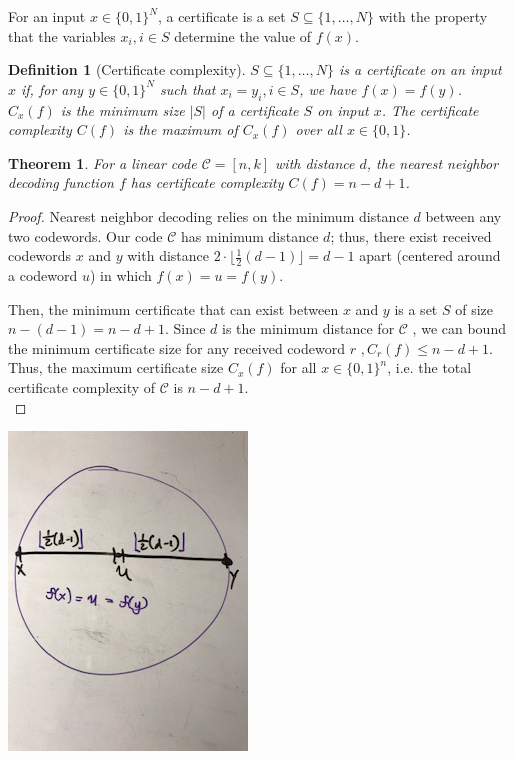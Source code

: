 \documentclass[12pt]{article}
\newtheorem{theorem}{Theorem}
\newtheorem{definition}{Definition}
\begin{document}
For an input $x \in \{0,1\}^N$, a certificate is a set $S \subseteq \{1, \ldots, N\}$ with the property that the variables $x_i, i \in S$ determine the value of $f(x)$. 
 
\begin{definition}[Certificate complexity] $S \subseteq \{1, \ldots, N\}$ is a certificate on an input $x$ if, for any $y \in \{0,1\}^N$ such that $x_i = y_i, i \in S$, we have $f(x) = f(y)$. $C_x(f)$ is the minimum size $\lvert S \rvert$ of a certificate $S$ on input $x$. The certificate complexity $C(f)$ is the maximum of $C_x(f)$ over all $x\in \{0,1\}$.
\end{definition}

\begin{theorem}
For a linear code $\mathscr{C} = [n,k]$ with distance $d$, the nearest neighbor decoding function $f$ has certificate complexity $C(f) = n -d +1$.
\end{theorem}

\begin{proof}
Nearest neighbor decoding relies on the minimum distance $d$ between any two codewords. Our code $\mathscr{C} $ has minimum distance $d$; thus, there exist received codewords $x$ and $y$ with distance $2 \cdot \lfloor \frac{1}{2}(d-1)\rfloor = d-1$ apart (centered around a codeword $u$) in which $f(x) = u = f(y)$. 

Then, the minimum certificate that can exist between $x$ and $y$ is a set $S$ of size $n-(d-1) = n-d+1$. Since $d$ is the minimum distance for $\mathscr{C}$ , we can bound the minimum certificate size for any received codeword $r$ $, C_r(f) \leq n - d +1.$ Thus, the maximum certificate size $C_x(f)$ for all $x \in \{0,1\}^n$, i.e. the total certificate complexity of $\mathscr{C}$ is $n-d+1$.\\
\end{proof}

\includegraphics[scale=1, angle=270]{cert_comp_pic.jpg}
\end{document}
